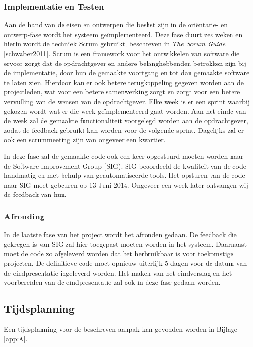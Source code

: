 \subsubsection{Implementatie en Testen}
Aan de hand van de eisen en ontwerpen die beslist zijn in de ori\"entatie- en ontwerp-fase wordt het systeem ge\"implementeerd. Deze fase duurt zes weken en hierin wordt de techniek Scrum gebruikt, beschreven in \emph{The Scrum Guide} \ref{schwaber2011}. Scrum is een framework voor het ontwikkelen van software die ervoor zorgt dat de opdrachtgever en andere belanghebbenden betrokken zijn bij de implementatie, door hun de gemaakte voortgang en tot dan gemaakte software te laten zien. Hierdoor kan er ook betere terugkoppeling gegeven worden aan de projectleden, wat voor een betere samenwerking zorgt en zorgt voor een betere vervulling van de wensen van de opdrachtgever. Elke week is er een sprint waarbij gekozen wordt wat er die week ge\"implementeerd gaat worden. Aan het einde van de week zal de gemaakte functionaliteit voorgelegd worden aan de opdrachtgever, zodat de feedback gebruikt kan worden voor de volgende sprint. Dagelijks zal er ook een scrummeeting zijn van ongeveer een kwartier.

In deze fase zal de gemaakte code ook een keer opgestuurd moeten worden naar de Software Improvement Group (SIG). SIG beoordeeld de kwaliteit van de code handmatig en met behulp van geautomatiseerde tools. Het opsturen van de code naar SIG moet gebeuren op 13 Juni 2014. Ongeveer een week later ontvangen wij de feedback van hun.

\subsubsection{Afronding}
In de laatste fase van het project wordt het afronden gedaan. De feedback die gekregen is van SIG zal hier toegepast moeten worden in het systeem. Daarnaast moet de code zo afgeleverd worden dat het herbruikbaar is voor toekomstige projecten. De definitieve code moet opnieuw uiterlijk 5 dagen voor de datum van de eindpresentatie ingeleverd worden. Het maken van het eindverslag en het voorbereiden van de eindpresentatie zal ook in deze fase gedaan worden.

\subsection{Tijdsplanning}
Een tijdsplanning voor de beschreven aanpak kan gevonden worden in Bijlage \ref{app:A}.\\

